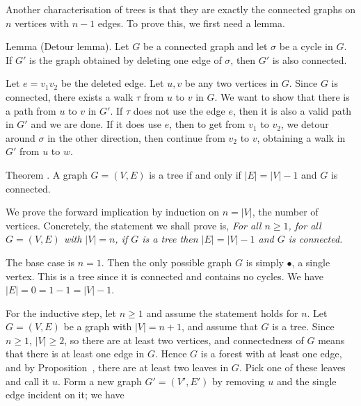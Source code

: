 Another characterisation of trees is that they are exactly the connected graphs on $n$ vertices
with $n-1$ edges. To prove this, we first need a lemma.

\parenproclaim Lemma {\advthm} (Detour lemma). Let $G$ be a connected graph and let
$\sigma$ be a cycle in $G$. If $G'$ is the graph obtained by deleting one edge
of $\sigma$, then $G'$ is also connected.

\proof Let $e = v_1v_2$ be the deleted edge. Let $u,v$ be any two vertices in $G$.
Since $G$ is connected, there exists a walk $\tau$ from $u$ to $v$ in $G$.
We want to show that there is a path from $u$ to $v$ in $G'$. If $\tau$ does not use
the edge $e$, then it is also a valid path in $G'$ and we are done. If it does use $e$,
then to get from $v_1$ to $v_2$,
we detour around $\sigma$ in the other direction, then continue from $v_2$ to $v$, obtaining
a walk in $G'$ from $u$ to $w$.\slug

\proclaim{} Theorem \advthm. A graph $G = (V,E)$ is a tree if and only if
$|E| = |V|-1$ and $G$ is connected.

\proof We prove the forward implication by induction on $n=|V|$, the number of vertices.
Concretely, the statement we shall prove is, {\sl For all $n\ge 1$, for all $G=(V,E)$ with
$|V| = n$, if $G$ is a tree then $|E| = |V|-1$ and $G$ is connected.}

The base case is $n=1$. Then the only possible graph $G$ is simply $\bullet$, a single vertex.
This is a tree since it is connected and contains no cycles. We have $|E| = 0 = 1-1 = |V|-1$.

For the inductive step, let $n\ge 1$ and assume the statement holds for $n$. Let $G = (V,E)$
be a graph with $|V| = n+1$, and assume that $G$ is a tree. Since $n\ge 1$,
$|V| \ge 2$, so there are at least two vertices, and connectedness of $G$ means that there
is at least one edge in $G$. Hence $G$ is a forest with at least one edge, and by
Proposition~{\proptwoleaves}, there are at least two leaves in $G$. Pick one of these leaves
and call it $u$. Form a new graph $G' = (V', E')$ by removing $u$ and the single edge
incident on it; we have


\bye
